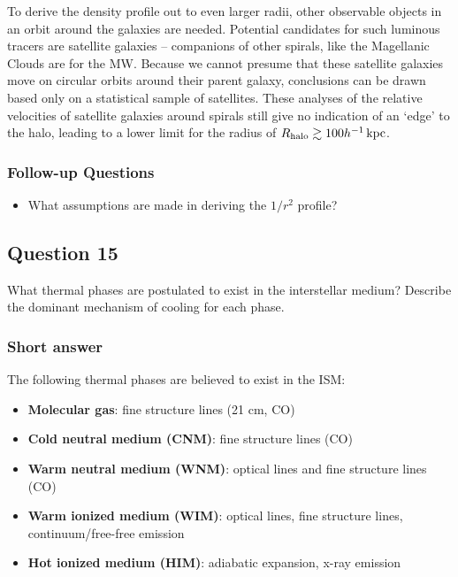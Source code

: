 \documentclass[a4paper,10pt]{article}
\begin{document}
{\noindent}To derive the density profile out to even larger radii, other observable objects in an orbit around the galaxies are needed. Potential candidates for such luminous tracers are satellite galaxies -- companions of other spirals, like the Magellanic Clouds are for the MW. Because we cannot presume that these satellite galaxies move on circular orbits around their parent galaxy, conclusions can be drawn based only on a statistical sample of satellites. These analyses of the relative velocities of satellite galaxies around spirals still give no indication of an `edge' to the halo, leading to a lower limit for the radius of $R_{\rm halo}\gtrsim100h^{-1}\,{\rm kpc}$.

\subsubsection{Follow-up Questions}

\begin{itemize}
    \item What assumptions are made in deriving the $1/r^2$ profile?
\end{itemize}


\newpage
\subsection{Question 15}

What thermal phases are postulated to exist in the interstellar medium? Describe the dominant mechanism of cooling for each phase.

\subsubsection{Short answer}

The following thermal phases are believed to exist in the ISM:

\begin{itemize}
    \item \textbf{Molecular gas}: fine structure lines (21 cm, CO)
    \item \textbf{Cold neutral medium (CNM)}: fine structure lines (CO)
    \item \textbf{Warm neutral medium (WNM)}: optical lines and fine structure lines (CO)
    \item \textbf{Warm ionized medium (WIM)}: optical lines, fine structure lines, continuum/free-free emission
    \item \textbf{Hot ionized medium (HIM)}: adiabatic expansion, x-ray emission
\end{itemize}
\end{document}
